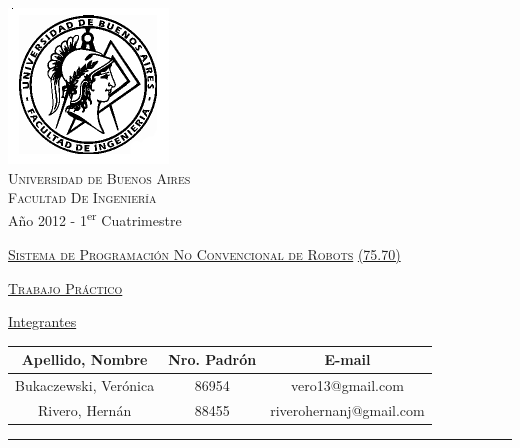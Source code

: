\documentclass[12pt,titlepage]{article}
\begin{document}
\begin{titlepage}

\thispagestyle{empty}

\begin{center}
\includegraphics[scale=0.55]{./Images/fiuba}\\
\large{\textsc{Universidad de Buenos Aires}}\\
\large{\textsc{Facultad De Ingeniería}}\\
\small{Año 2012 - 1\textsuperscript{er} Cuatrimestre}
\end{center}

\vfill

\begin{center}

\Large{\underline{\textsc{Sistema de Programaci\'on No Convencional de Robots}}}
\Large{\underline{\textsc{(75.70)}}}

\vfill


\Large{\underline{\textsc{Trabajo Pr\'actico}}}

\vfill
 
\Large\underline{Integrantes} \linebreak\linebreak

\large\addtolength{\tabcolsep}{-3pt}
\begin{tabular}{|| c | c | c ||}
\hline
\textbf{Apellido, Nombre} & \textbf{Nro. Padrón} & \textbf{E-mail} \\
\hline
Bukaczewski, Verónica & 86954 & vero13@gmail.com \\
\hline
Rivero, Hern\'an & 88455 & riverohernanj@gmail.com \\
\hline
\end{tabular}
\end{center}

\vfill

\hrule
\vspace{0.2cm}


\end{titlepage}
\end{document}
